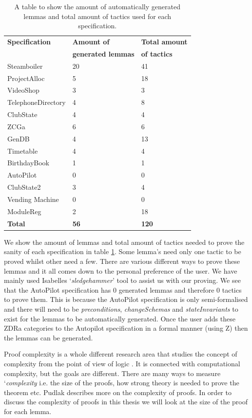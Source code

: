 \begin{table}[H]
\begin{tabular}{|l | l | l |}
\hline
\textbf{Specification} & \textbf{Amount of} & \textbf{Total amount} \\
& \textbf{generated lemmas} & \textbf{of tactics} \\
\hline
Steamboiler & 20 & 41 \\
ProjectAlloc & 5 & 18 \\
VideoShop & 3 & 3 \\
TelephoneDirectory & 4 & 8 \\
ClubState & 4 & 4 \\
ZCGa & 6 & 6 \\
GenDB & 4 & 13 \\
Timetable & 4 & 4 \\
BirthdayBook & 1 & 1\\
AutoPilot & 0 & 0 \\
ClubState2 & 3 & 4 \\
Vending Machine & 0 & 0 \\
ModuleReg & 2 & 18 \\
\hline
\textbf{Total} & \textbf{56} & \textbf{120}\\
\hline
\end{tabular}
\caption{A table to show the amount of automatically generated lemmas and total amount of tactics used for each specification. \label{tab:lemmatact}}
\end{table}

We show the amount of lemmas and total amount of tactics needed to prove the
sanity of each specification in table \ref{tab:lemmatact}. Some lemma's need
only one tactic to be proved whilst other need a few. There are various
different ways to prove these lemmas and it all comes down to the personal
preference of the user. We have mainly used Isabelles `\emph{sledgehammer}' tool
to assist us with our proving.
We see that the AutoPilot specification has 0 generated lemmas and therefore 0
tactics to prove them. This is because the AutoPilot specification is only
semi-formalised and there will need to be \textit{preconditions}, \textit{changeSchemas} and
\textit{stateInvariants} to exist for the lemmas to be automatically generated.
Once the user adds these ZDRa categories to the Autopilot specification in a
formal manner (using Z) then the lemmas can be generated.

Proof complexity is a whole different research area that studies the concept of
complexity from the point of view of logic \cite{complexityofproofs}. It is connected with
computational complexity, but the goals are different. There are many ways to
measure `\textit{complexity} i.e. the size of the proofs, how strong theory is
needed to prove the theorem etc. Pudlak \cite{complexityofproofs} describes more on the
complexity of proofs. In order to discuss the complexity of proofs in this
thesis we will look at the size of the proof for each lemma.

